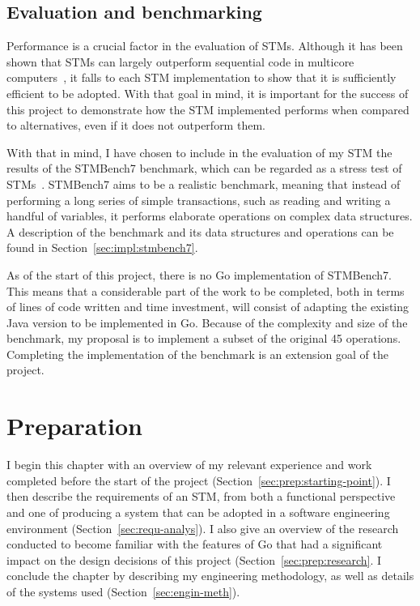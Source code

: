\documentclass[12pt,a4paper,oneside,openright]{report}
\begin{document}
\section{Evaluation and benchmarking}
\label{sec:eval-benchm}

Performance is a crucial factor in the evaluation of STMs. Although it
has been shown that STMs can largely outperform sequential code in
multicore computers~\cite{MoreThanToy}, it falls to each STM
implementation to show that it is sufficiently efficient to be
adopted. With that goal in mind, it is important for the success of
this project to demonstrate how the STM implemented performs when
compared to alternatives, even if it does not outperform them.

With that in mind, I have chosen to include in the evaluation of my
STM the results of the STMBench7 benchmark, which can be regarded as a
stress test of STMs~\cite{STMBench7}. STMBench7 aims to be a realistic
benchmark, meaning that instead of performing a long series of simple
transactions, such as reading and writing a handful of variables, it
performs elaborate operations on complex data structures. A
description of the benchmark and its data structures and operations
can be found in Section~\ref{sec:impl:stmbench7}.

As of the start of this project, there is no Go implementation of
STMBench7. This means that a considerable part of the work to be
completed, both in terms of lines of code written and time investment,
will consist of adapting the existing Java version to be implemented
in Go. Because of the complexity and size of the benchmark, my
proposal is to implement a subset of the original 45
operations. Completing the implementation of the benchmark is an
extension goal of the project.


\chapter{Preparation}

I begin this chapter with an overview of my relevant experience and
work completed before the start of the project
(Section~\ref{sec:prep:starting-point}). I then describe the
requirements of an STM, from both a functional perspective and one of
producing a system that can be adopted in a software engineering
environment (Section~\ref{sec:requ-analys}). I also give an overview
of the research conducted to become familiar with the features of Go
that had a significant impact on the design decisions of this project
(Section~\ref{sec:prep:research}. I conclude the chapter by describing
my engineering methodology, as well as details of the systems used
(Section~\ref{sec:engin-meth}).
\end{document}
